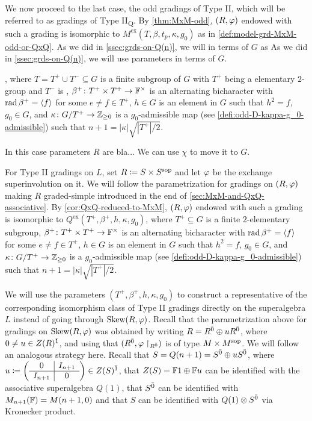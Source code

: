 We now proceed to the last case, the odd gradings of Type II, which will be referred to as gradings of Type II\textsubscript{Q}. 
By \cref{thm:MxM-odd}, $(R, \varphi)$ endowed with such a grading is isomorphic to $M^{\mathrm{ex}} (T, \beta, t_p, \kappa, g_0)$ as in \cref{def:model-grd-MxM-odd-or-QxQ}. 
As we did in \cref{ssec:grds-on-Q(n)}, we will in terms of $G$ as 
As we did in \cref{ssec:grds-on-Q(n)}, we will use parameters in terms of $G$. 
 


, where $T = T^+ \cup T^-\subseteq G$ is a finite subgroup of $G$ with $T^+$ being a elementary $2$-group and $T^-$ is , $\beta^+\colon T^+\times T^+ \to \mathbb{F}^\times$ is an alternating bicharacter with $\operatorname{rad} \beta^+ = \langle f \rangle$ for some $e\neq f \in T^+$, $h\in G$ is an element in $G$ such that $h^2 = f$, $g_0\in G$, and $\kappa\colon G/T^+ \to \mathbb{Z}_{\geq 0}$ is a $g_0$-admissible map (see \cref{defi:odd-D-kappa-g_0-admissible}) such that $n+1 = |\kappa| \sqrt{|T^+|/2}$. 

In this case parameters $R$ are bla...
We can use $\chi$ to move it to $G$. 


For Type II gradings on $L$,
set $R \coloneqq S\times S^{\mathrm{sop}}$ and let $\varphi$ be the exchange superinvolution on it. 
We will follow the parametrization for gradings on $(R, \varphi)$ making $R$ graded-simple introduced in the end of \cref{sec:MxM-and-QxQ-associative}. 
By  \cref{cor:QxQ-reduced-to-MxM}, $(R, \varphi)$ endowed with such a grading is isomorphic to $Q^{\mathrm{ex}} (T^+, \beta^+, h, \kappa, g_0)$, where $T^+ \subseteq G$ is a finite $2$-elementary subgroup, $\beta^+\colon T^+\times T^+ \to \mathbb{F}^\times$ is an alternating bicharacter with $\operatorname{rad} \beta^+ = \langle f \rangle$ for some $e\neq f \in T^+$, $h\in G$ is an element in $G$ such that $h^2 = f$, $g_0\in G$, and $\kappa\colon G/T^+ \to \mathbb{Z}_{\geq 0}$ is a $g_0$-admissible map (see \cref{defi:odd-D-kappa-g_0-admissible}) such that $n+1 = |\kappa| \sqrt{|T^+|/2}$. 

We will use the parameters $(T^+, \beta^+, h, \kappa, g_0)$ to construct a representative of the corresponding isomorphism class of Type II gradings directly on the superalgebra $L$ instead of going through $\operatorname{Skew}(R, \varphi)$. 
Recall that the parametrization above for gradings on $\operatorname{Skew}(R, \varphi)$ was obtained by writing $R = R^{\bar0} \oplus u R^{\bar0}$, where $0 \neq u \in Z(R)^{\bar1}$, and using that $(R^{\bar0}, \varphi\restriction_{R^{\bar0}})$ is of type $M\times M^{\mathrm{sop}}$.  
We will follow an analogous strategy here. 
Recall that $S = Q(n+1) = S^{\bar0} \oplus u S^{\bar0}$, where
$ 
    u \coloneqq
    \left(\begin{array}{c|c}
        0 & I_{n+1}\\
        \hline
        I_{n+1} & 0\\
    \end{array}\right)
    \in Z(S)^{\bar1}
$,
that $Z(S) = \mathbb{F}1 \oplus \mathbb{F} u$ can be identified with the associative superalgebra $Q(1)$, that $S^{\bar0}$ can be identified with $M_{n+1}(\mathbb{F}) = M(n+1, 0)$ and that $S$ can be identified with $Q(1)\otimes S^{\bar0}$ via Kronecker product. 

